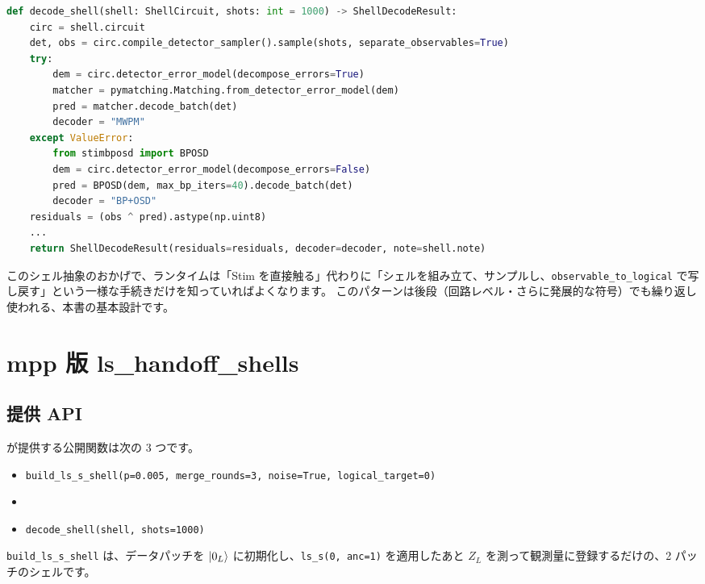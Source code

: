 \begin{lstlisting}[language=Python, caption={decode\_shell（src/stages/01\_mpp/src/ftqc/ls\_handoff\_shells.py）}]
def decode_shell(shell: ShellCircuit, shots: int = 1000) -> ShellDecodeResult:
    circ = shell.circuit
    det, obs = circ.compile_detector_sampler().sample(shots, separate_observables=True)
    try:
        dem = circ.detector_error_model(decompose_errors=True)
        matcher = pymatching.Matching.from_detector_error_model(dem)
        pred = matcher.decode_batch(det)
        decoder = "MWPM"
    except ValueError:
        from stimbposd import BPOSD
        dem = circ.detector_error_model(decompose_errors=False)
        pred = BPOSD(dem, max_bp_iters=40).decode_batch(det)
        decoder = "BP+OSD"
    residuals = (obs ^ pred).astype(np.uint8)
    ...
    return ShellDecodeResult(residuals=residuals, decoder=decoder, note=shell.note)
\end{lstlisting}

このシェル抽象のおかげで、ランタイムは「Stim を直接触る」代わりに「シェルを組み立て、サンプルし、\texttt{observable\_to\_logical} で写し戻す」という一様な手続きだけを知っていればよくなります。
このパターンは後段（回路レベル・さらに発展的な符号）でも繰り返し使われる、本書の基本設計です。

\section{mpp 版 ls\_handoff\_shells}\label{sec:mpp_shells}

\subsection{提供 API}\label{subsec:mpp_api}

 が提供する公開関数は次の 3 つです。

\begin{itemize}
  \item \texttt{build\_ls\_s\_shell(p=0.005, merge\_rounds=3, noise=True, logical\_target=0)}
  \item {}
  \item \texttt{decode\_shell(shell, shots=1000)}
\end{itemize}

\texttt{build\_ls\_s\_shell} は、データパッチを $\ket{0_L}$ に初期化し、\texttt{ls\_s(0, anc=1)} を適用したあと $Z_L$ を測って観測量に登録するだけの、2 パッチのシェルです。

